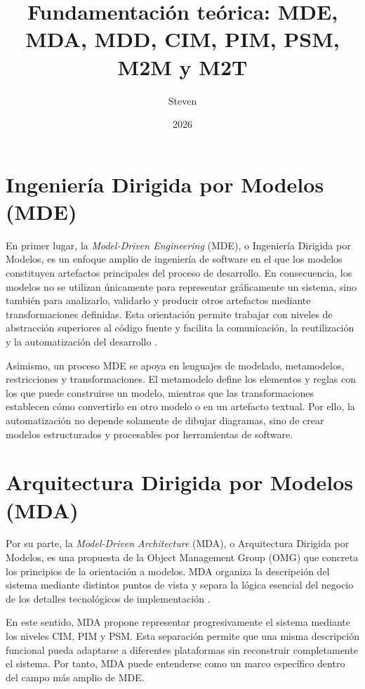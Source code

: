 \documentclass[12pt,a4paper]{article}
\title{Fundamentación teórica: MDE, MDA, MDD, CIM, PIM, PSM, M2M y M2T}
\author{Steven}
\date{2026}
\begin{document}
\maketitle

\section{Ingeniería Dirigida por Modelos (MDE)}

En primer lugar, la \textit{Model-Driven Engineering} (MDE), o Ingeniería Dirigida por Modelos, es un enfoque amplio de ingeniería de software en el que los modelos constituyen artefactos principales del proceso de desarrollo. En consecuencia, los modelos no se utilizan únicamente para representar gráficamente un sistema, sino también para analizarlo, validarlo y producir otros artefactos mediante transformaciones definidas. Esta orientación permite trabajar con niveles de abstracción superiores al código fuente y facilita la comunicación, la reutilización y la automatización del desarrollo \cite{brambilla2017}.

Asimismo, un proceso MDE se apoya en lenguajes de modelado, metamodelos, restricciones y transformaciones. El metamodelo define los elementos y reglas con los que puede construirse un modelo, mientras que las transformaciones establecen cómo convertirlo en otro modelo o en un artefacto textual. Por ello, la automatización no depende solamente de dibujar diagramas, sino de crear modelos estructurados y procesables por herramientas de software.

\section{Arquitectura Dirigida por Modelos (MDA)}

Por su parte, la \textit{Model-Driven Architecture} (MDA), o Arquitectura Dirigida por Modelos, es una propuesta de la Object Management Group (OMG) que concreta los principios de la orientación a modelos. MDA organiza la descripción del sistema mediante distintos puntos de vista y separa la lógica esencial del negocio de los detalles tecnológicos de implementación \cite{omg2014mda}.

En este sentido, MDA propone representar progresivamente el sistema mediante los niveles CIM, PIM y PSM. Esta separación permite que una misma descripción funcional pueda adaptarse a diferentes plataformas sin reconstruir completamente el sistema. Por tanto, MDA puede entenderse como un marco específico dentro del campo más amplio de MDE.
\end{document}

